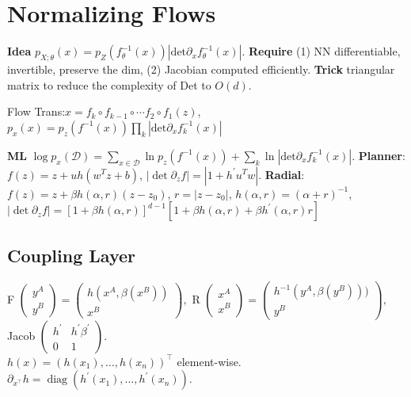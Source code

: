 \section{Normalizing Flows}
\textbf{Idea} \( p_{X;\theta}(x)=p_{Z}(f_{\theta}^{-1}(x))|\text{det}\partial_{x} f_{\theta}^{-1}(x)|\).
\textbf{Require} (1) NN differentiable, invertible, preserve the dim, (2) Jacobian computed efficiently.
\textbf{Trick} triangular matrix to reduce the complexity of Det to \(O(d)\).

Flow Trans:\({x} = f_{k} \circ f_{k-1} \circ \cdots f_{2} \circ f_{1}(z)\), \(p_{x}(x)=p_{z}(f^{-1}(x)) \prod_{k}|\text{det}\partial_{x} f_{k}^{-1}(x)| \)

\textbf{ML} \(\log p_{x}({\mathcal{D}})=\sum_{x \in \mathcal{D}}\ln p_{z}(f^{-1}({x}))+\sum_{k} \ln|\text{det}\partial_{x} f_{k}^{-1}(x)| \).
\textbf{Planner}: \(f(z)={z}+{u h}({w}^{T} {z}+{b})\), \(|\operatorname{det} \partial_{{z}} f |=|1+h^{\prime} {u}^{T} {w}|\).
\textbf{Radial}: \(f({z})={z}+\beta h(\alpha, r)({z}-{z}_{0})\), \(r=|{z}-{z}_{0}|\), \(h(\alpha, r)=(\alpha+r)^{-1}\), \(|\operatorname{det} \partial_{{z}} f| = [1+\beta h(\alpha, r)]^{d-1}[1+\beta h(\alpha, r)+\beta h^{\prime}(\alpha, r) r]\)

\subsection*{Coupling Layer}
\textsf{F}
\(\left(\begin{array}{c}
        y^{A} \\
        y^{B}
    \end{array}\right)=\left(\begin{array}{c}
        h(x^{A}, \beta(x^{B})) \\
        x^{B}
    \end{array}\right),\)
\textsf{R} \(\left(\begin{array}{l}
        x^{A} \\
        x^{B}
    \end{array}\right)=\left(\begin{array}{c}
        h^{-1}(y^{A}, \beta(y^{B}))) \\
        y^{B}
    \end{array}\right),\)
Jacob \(\left(\begin{array}{cc}
        h^{\prime} & h^{\prime} \beta^{\prime} \\
        0          & 1
    \end{array}\right).\)\\
\(h(x) = (h(x_{1}), \ldots, h(x_{n}))^{\top}\) element-wise. \( \partial_{x^{\top}} h=\operatorname{diag}(h^{\prime}(x_{1}), \ldots, h^{\prime}(x_{n}))\).

